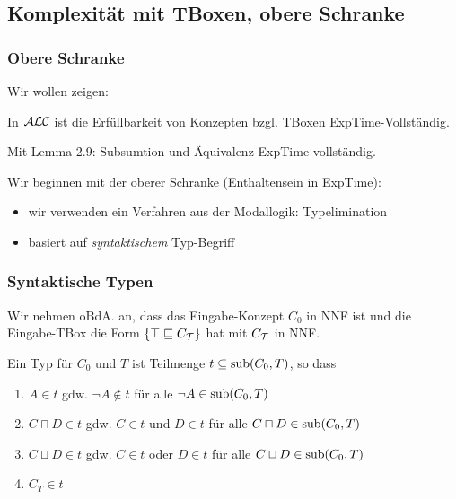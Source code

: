 \subsection{Komplexität mit TBoxen, obere
Schranke}\label{komplexituxe4t-mit-tboxen-obere-schranke}

\subsubsection{Obere Schranke}

Wir wollen zeigen:

\begin{theorem}
In $\mathcal{A}\mathcal{L}\mathcal{C}$ ist die Erfüllbarkeit von Konzepten bzgl. TBoxen
ExpTime-Vollständig.
\end{theorem}

Mit Lemma 2.9: Subsumtion und Äquivalenz ExpTime-vollständig.

Wir beginnen mit der oberer Schranke (Enthaltensein in ExpTime):

\begin{itemize}
  \item wir verwenden ein Verfahren aus der Modallogik: Typelimination
  \item basiert auf \emph{syntaktischem} Typ-Begriff
\end{itemize}

\subsubsection{Syntaktische Typen}\label{synt-typ}

Wir nehmen oBdA. an, dass das Eingabe-Konzept $C_0$ in NNF ist und die Eingabe-TBox die Form $\{\top \sqsubseteq C_{\mathcal{T}}\}$ hat mit $C_{\mathcal{T}}$ in NNF.

\begin{definition}[Typ]

Ein Typ für $C_{0}$ und $T$ ist Teilmenge
$t \subseteq \sub\left( C_{0},T \right)$, so dass

\begin{enumerate}
\item
  $A \in t$ gdw. $\neg A \notin t$ für alle
  $\neg A \in \sub\left( C_{0},T \right)$
\item
  $C \sqcap D \in t$ gdw. $C \in t$ und $D \in t$ für alle
  $C \sqcap D \in \sub\left( C_{0},T \right)$
\item
  $C \sqcup D \in t$ gdw. $C \in t$ oder $D \in t$ für alle
  $C \sqcup D \in \sub\left( C_{0},T \right)$
\item
  $C_{T} \in t$
\end{enumerate}
\end{definition}

